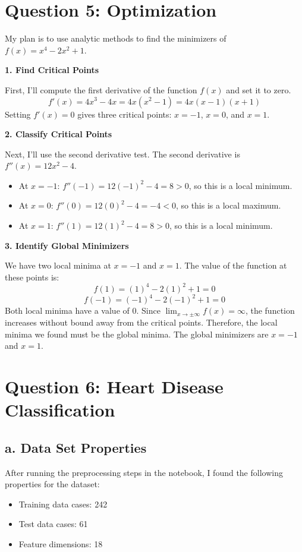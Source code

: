 \documentclass[11pt]{article}
\begin{document}
\section*{Question 5: Optimization}

\noindent
My plan is to use analytic methods to find the minimizers of $f(x) = x^4 - 2x^2 + 1$. 

\medskip
\noindent
\textbf{1. Find Critical Points}

\noindent
First, I'll compute the first derivative of the function $f(x)$ and set it to zero.
\[
f'(x) = 4x^3 - 4x = 4x(x^2 - 1) = 4x(x-1)(x+1)
\]
Setting $f'(x)=0$ gives three critical points: $x = -1$, $x = 0$, and $x = 1$.

\medskip
\noindent
\textbf{2. Classify Critical Points}

\noindent
Next, I'll use the second derivative test. The second derivative is $f''(x) = 12x^2 - 4$.
\begin{itemize}
    \item At $x = -1$: $f''(-1) = 12(-1)^2 - 4 = 8 > 0$, so this is a local minimum.
    \item At $x = 0$: $f''(0) = 12(0)^2 - 4 = -4 < 0$, so this is a local maximum.
    \item At $x = 1$: $f''(1) = 12(1)^2 - 4 = 8 > 0$, so this is a local minimum.
\end{itemize}

\medskip
\noindent
\textbf{3. Identify Global Minimizers}

\noindent
We have two local minima at $x = -1$ and $x = 1$. The value of the function at these points is:
\[
f(1) = (1)^4 - 2(1)^2 + 1 = 0
\]
\[
f(-1) = (-1)^4 - 2(-1)^2 + 1 = 0
\]
Both local minima have a value of 0. Since $\lim_{x \to \pm\infty} f(x) = \infty$, the function increases without bound away from the critical points. Therefore, the local minima we found must be the global minima. The global minimizers are $x = -1$ and $x = 1$.

\section*{Question 6: Heart Disease Classification}

\subsection*{a. Data Set Properties}

\noindent
After running the preprocessing steps in the notebook, I found the following properties for the dataset:
\begin{itemize}
    \item Training data cases: 242
    \item Test data cases: 61
    \item Feature dimensions: 18
\end{itemize}
\end{document}

